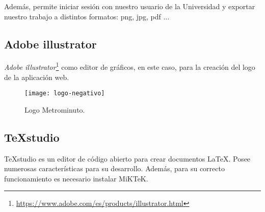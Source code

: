 Además, permite iniciar sesión con nuestro usuario de la Universidad y exportar nuestro trabajo a distintos formatos: png, jpg, pdf $\dots$

\subsection{Adobe illustrator}
\textit{Adobe illustrator}\footnote{\url{https://www.adobe.com/es/products/illustrator.html}} como editor de gráficos, en este caso, para la creación del logo de la aplicación web.

\begin{figure}[!h]
	\centering
	\texttt{[image: logo-negativo]}
	\caption{Logo Metrominuto.}\label{fig:logo-negativo}
\end{figure}
\FloatBarrier


\subsection{\TeX\hspace{0mm}studio}
\TeX\hspace{0mm}studio es un editor de código abierto para crear documentos \LaTeX. Posee numerosas características para su desarrollo. Además, para su correcto funcionamiento es necesario instalar MiKTeK.

